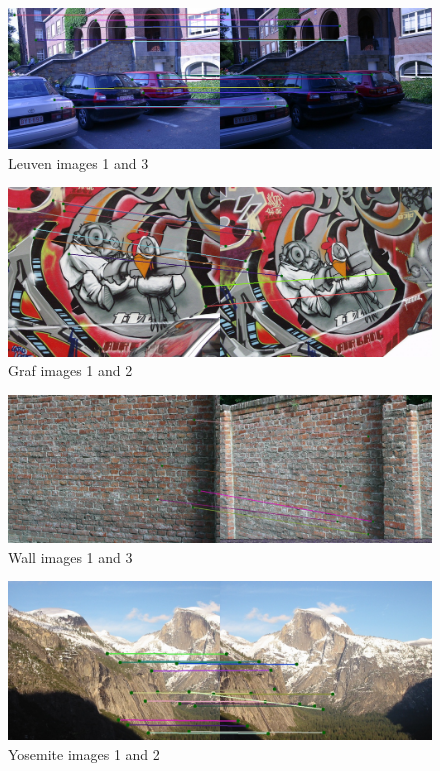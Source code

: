 \documentclass[10pt,twocolumn,letterpaper]{article}
\begin{document}
\begin{figure}[ht!]
\centering
\includegraphics[width=1\textwidth]{img/leuven1_3_ratio.jpg}
\caption{Leuven images 1 and 3}
\label{fig:leuven}
\end{figure}

\begin{figure}[ht!]
\centering
\includegraphics[width=1\textwidth]{img/graf1_2_ratio.jpg}
\caption{Graf images 1 and 2}
\label{fig:graf}
\end{figure}

\begin{figure}[ht!]
\centering
\includegraphics[width=1\textwidth]{img/wall1_3_ratio.jpg}
\caption{Wall images 1 and 3}
\label{fig:wall}
\end{figure}

\begin{figure}[ht!]
\centering
\includegraphics[width=1\textwidth]{img/Yosemite1_2_ratio.jpg}
\caption{Yosemite images 1 and 2}
\label{fig:yosemite}
\end{figure}
\end{document}
